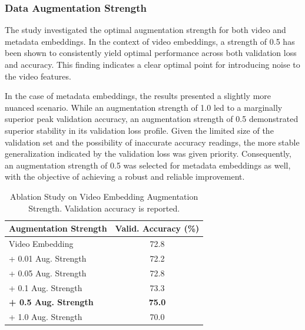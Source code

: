 \subsubsection{Data Augmentation Strength}



The study investigated the optimal augmentation strength for both video and metadata embeddings.
In the context of video embeddings, a strength of 0.5 has been shown to consistently yield optimal performance across both validation loss and accuracy.
This finding indicates a clear optimal point for introducing noise to the video features.

In the case of metadata embeddings, the results presented a slightly more nuanced scenario.
While an augmentation strength of 1.0 led to a marginally superior peak validation accuracy, an augmentation strength of 0.5 demonstrated superior stability in its validation loss profile.
Given the limited size of the validation set and the possibility of inaccurate accuracy readings, the more stable generalization indicated by the validation loss was given priority.
Consequently, an augmentation strength of 0.5 was selected for metadata embeddings as well, with the objective of achieving a robust and reliable improvement.

\begin{table}[hbt!]
\centering
\caption{Ablation Study on Video Embedding Augmentation Strength. Validation accuracy is reported.}
\label{tab:video_aug_ablation}
\small
\begin{tabular}{lc}
\toprule
Augmentation Strength & Valid. Accuracy (\%) \\
\midrule
Video Embedding & 72.8 \\
+ 0.01 Aug. Strength & 72.2 \\
+ 0.05 Aug. Strength  & 72.8 \\
+ 0.1 Aug. Strength & 73.3 \\
\textbf{+ 0.5 Aug. Strength} & \textbf{75.0} \\
+ 1.0 Aug. Strength & 70.0 \\
\bottomrule
\end{tabular}
\end{table}


